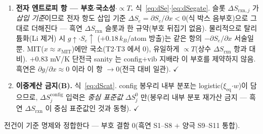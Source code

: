 \documentclass[11pt,a4paper]{article}
\newcommand{\eq}{\mathrm{eq}}
\newcommand{\rxn}{\mathrm{rxn}}
\newcommand{\config}{\mathrm{config}}
\newcommand{\MIT}{\mathrm{MIT}}
\begin{document}
\begin{enumerate}[label=\textbf{S\arabic*.},leftmargin=2.6em,itemsep=2pt]
방전 규약(식~\eqref{eq:xieq})도 양극에서 동일. $\checkmark$
\item \textbf{전자 엔트로피 항 — 부호$\cdot$국소성$\cdot$$\propto T$.} 식~\eqref{eq:dSe}$\cdot$\eqref{eq:dSegate}.
슬롯 $\Delta S_{\rxn,j}$ 가 \emph{삽입 기준}이므로 전자 항도 삽입 기준 $\Delta S_e=\partial S_e/\partial x<0$(식 박스 음부호)으로
그대로 더해진다 — 흑연 $\Delta S_\rxn$ 슬롯과 한 규약(부호 뒤집기 없음). 물리적으로 탈리튬화(Li 제거) 시 $g\!\uparrow$$\cdot$$S_e\!\uparrow$
($+0.18\,k_B$/atom 방출)는 같은 항의 $-\partial S_e/\partial x$ 서술일 뿐. MIT($x\approx x_\MIT$)에만 국소(T2$\cdot$T3 에서 $0$),
유일하게 $\propto T$(상수 $\Delta S_\rxn$ 항과 대비). $+0.83$ mV/K 단전극 sanity 는 config$+$vib 지배라 이 부호를 제약하지 않음.
흑연은 $\partial g/\partial x\!\approx\!0$ 이라 이 항 $\to0$(전극 대비 일관). $\checkmark$
\item \textbf{이중계산 금지(B).} 식~\eqref{eq:dScat}. config 봉우리 내부 분포는 logistic($\xi_\eq$$\cdot$$w$)이 담으므로,
$\Delta S^\config_j$ 입력은 \emph{중심 표준값} $\Delta S^0_j$ 만(봉우리 내부 분포 재가산 금지 — 흑연 $\Delta S_\rxn$ 이
중심 표준값인 것과 동형). $\checkmark$
\end{enumerate}
전건이 기준 명제와 정합한다 — 부호 결함 $0$(흑연 S1--S8 $+$ 양극 S9--S11 통합).
\end{document}

